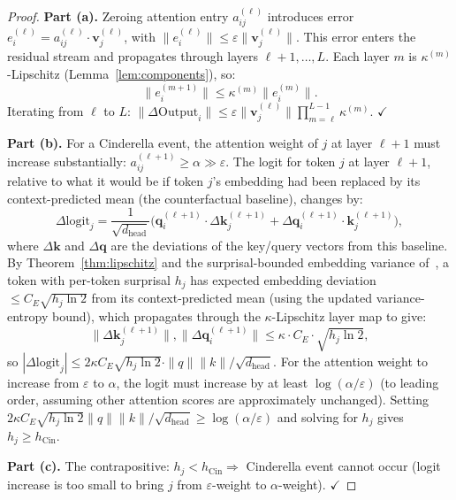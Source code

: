\documentclass[11pt]{article}
\begin{document}
\begin{proof}
\textbf{Part (a).}  Zeroing attention entry $a^{(\ell)}_{ij}$ introduces error
$e^{(\ell)}_i = a^{(\ell)}_{ij} \cdot \mathbf{v}^{(\ell)}_j$, with
$\|e^{(\ell)}_i\| \leq \varepsilon \|\mathbf{v}^{(\ell)}_j\|$.  This error
enters the residual stream and propagates through layers $\ell+1,\ldots,L$.
Each layer $m$ is $\kappa^{(m)}$-Lipschitz (Lemma~\ref{lem:components}), so:
\[
  \|e^{(m+1)}_i\| \leq \kappa^{(m)} \|e^{(m)}_i\|.
\]
Iterating from $\ell$ to $L$:
$\|\Delta \mathrm{Output}_i\| \leq \varepsilon \|\mathbf{v}^{(\ell)}_j\|
\prod_{m=\ell}^{L-1}\kappa^{(m)}$. $\checkmark$

\textbf{Part (b).}  For a Cinderella event, the attention weight of $j$ at
layer $\ell+1$ must increase substantially: $a^{(\ell+1)}_{ij} \geq \alpha
\gg \varepsilon$.  The logit for token $j$ at layer $\ell+1$, relative to what
it would be if token $j$'s embedding had been replaced by its context-predicted
mean (the counterfactual baseline), changes by:
\[
  \Delta \mathrm{logit}_j
  = \frac{1}{\sqrt{d_{\mathrm{head}}}}\bigl(\mathbf{q}^{(\ell+1)}_i \cdot \Delta\mathbf{k}^{(\ell+1)}_j
  + \Delta\mathbf{q}^{(\ell+1)}_i \cdot \mathbf{k}^{(\ell+1)}_j\bigr),
\]
where $\Delta\mathbf{k}$ and $\Delta\mathbf{q}$ are the deviations of the
key/query vectors from this baseline.  By Theorem~\ref{thm:lipschitz} and the
surprisal-bounded embedding variance of~\cite{kv2026}, a token with per-token
surprisal $h_j$ has expected embedding deviation $\leq C_E\sqrt{h_j \ln 2}$
from its context-predicted mean (using the updated variance-entropy bound),
which propagates through the $\kappa$-Lipschitz layer map to give:
\[
  \|\Delta\mathbf{k}^{(\ell+1)}_j\|, \|\Delta\mathbf{q}^{(\ell+1)}_i\|
  \leq \kappa \cdot C_E \cdot \sqrt{h_j \ln 2},
\]
so $|\Delta\mathrm{logit}_j| \leq 2\kappa C_E \sqrt{h_j \ln 2} \cdot \|q\|\|k\|/\sqrt{d_{\mathrm{head}}}$.
For the attention weight to increase from $\varepsilon$ to $\alpha$, the logit
must increase by at least $\log(\alpha/\varepsilon)$ (to leading order, assuming other attention scores are approximately unchanged).  Setting
$2\kappa C_E \sqrt{h_j \ln 2}\|q\|\|k\|/\sqrt{d_{\mathrm{head}}} \geq \log(\alpha/\varepsilon)$
and solving for $h_j$ gives $h_j \geq h_{\mathrm{Cin}}$.

\textbf{Part (c).}  The contrapositive: $h_j < h_{\mathrm{Cin}} \Rightarrow$
Cinderella event cannot occur (logit increase is too small to bring $j$ from
$\varepsilon$-weight to $\alpha$-weight). $\checkmark$
\end{proof}
\end{document}
